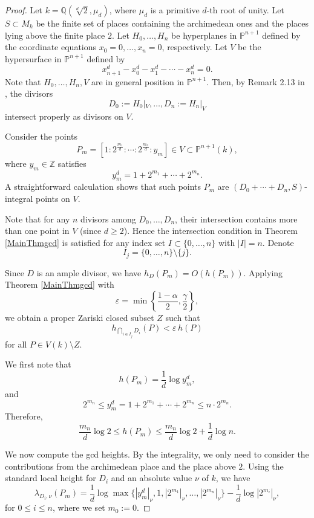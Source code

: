 \documentclass[10pt]{amsart}
\numberwithin{equation}{section}
\theoremstyle{plain}
\theoremstyle{definition}
\begin{document}
   
\begin{proof}
Let $k=\mathbb{Q}(\sqrt[d]{2},\mu_d)$, where $\mu_d$ is a primitive $d$-th root of unity. 
Let $S\subset M_k$ be the finite set of places containing the archimedean ones and the places lying above the finite place $2$. 
Let $H_0,\ldots,H_n$ be hyperplanes in $\mathbb{P}^{n+1}$ defined by the coordinate equations 
$x_0=0,\ldots,x_n=0$, respectively. 
Let $V$ be the hypersurface in $\mathbb{P}^{n+1}$ defined by
\[
x_{n+1}^d-x_0^d-x_1^d-\cdots-x_n^d=0 .
\]
Note that $H_0,\ldots,H_n,V$ are in general position in $\mathbb{P}^{n+1}$. 
Then, by Remark 2.13 in \cite{HLX}, the divisors
\[
D_0:=H_0|_V,\ldots,D_n:=H_n|_V
\]
intersect properly as divisors on $V$.

Consider the points
\[
P_m= [1:2^{\frac{m_1}{d}}:\cdots:2^{\frac{m_n}{d}}:y_m]\in V\subset \mathbb{P}^{n+1}(k),
\]
where $y_m\in\mathbb{Z}$ satisfies
\[
y_m^d=1+2^{m_1}+\cdots+2^{m_n}.
\]
A straightforward calculation shows that such points $P_m$ are $(D_0+\cdots+D_n,S)$-integral points on $V$.

Note that for any $n$ divisors among $D_0,\ldots,D_n$, their intersection contains more than one point  in $V$ (since $d\ge2$). 
Hence the intersection condition in Theorem \ref{MainThmgcd} is satisfied for any index set 
$I\subset\{0,\ldots,n\}$ with $|I|=n$. 
Denote
\[
I_j=\{0,\ldots,n\}\setminus\{j\}.
\]

Since $D$ is an ample divisor, we have $h_D(P_m)=O(h(P_m))$. 
Applying Theorem \ref{MainThmgcd} with
\[
\varepsilon=\min\!\left\{\frac{1-\alpha}{2},\frac{\gamma}{2}\right\},
\]
we obtain a proper Zariski closed subset $Z$ such that
\begin{equation}\label{gcddigit}
h_{\bigcap_{i\in I_j}D_i}(P)<\varepsilon\,h(P)
\end{equation}
for all $P\in V(k)\setminus Z$.

We first note that
\begin{equation}\label{heightP}
h(P_m)=\frac{1}{d}\log y_m^d,
\end{equation}
and
\begin{equation}\label{heightineq}
2^{m_n}\le y_m^d=1+2^{m_1}+\cdots+2^{m_n}\le n\cdot2^{m_n}.
\end{equation}
Therefore,
\begin{equation}\label{heightP2}
\frac{m_n}{d}\log2\le h(P_m)\le \frac{m_n}{d}\log2+\frac{1}{d}\log n .
\end{equation}

We now compute the gcd heights. By the integrality, we only need to consider the contributions from the archimedean place and the place above $2$. 
Using the standard local height for $D_i$ and an absolute value $\nu$ of $k$, we have
\[
\lambda_{D_i,\nu}(P_m)
=\frac{1}{d}\log\max\{|y_m^d|_\nu,1,|2^{m_1}|_\nu,\ldots,|2^{m_n}|_\nu\}
-\frac{1}{d}\log|2^{m_i}|_\nu,
\]
for $0\le i\le n$, where we set $m_0:=0$.


\end{proof}
\end{document}
